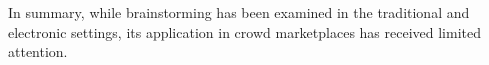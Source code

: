 
In summary, while brainstorming has been examined in the traditional and electronic settings, its application in crowd marketplaces has received limited attention. 